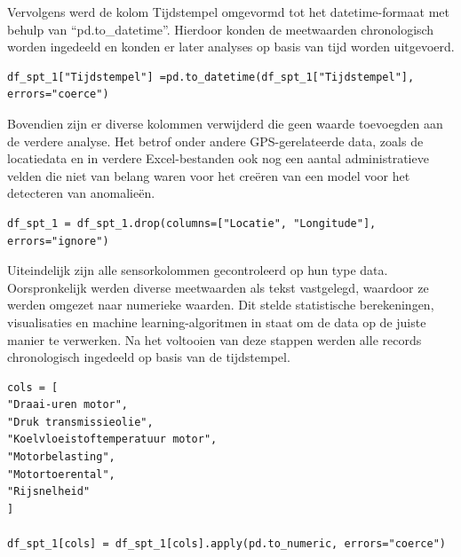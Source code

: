 Vervolgens werd de kolom Tijdstempel omgevormd tot het datetime-formaat met behulp van ``pd.to\_datetime''. Hierdoor konden de meetwaarden chronologisch worden ingedeeld en konden er later analyses op basis van tijd worden uitgevoerd.

\begin{listing}[H]
\begin{verbatim}
df_spt_1["Tijdstempel"] =pd.to_datetime(df_spt_1["Tijdstempel"], errors="coerce")
\end{verbatim}
\caption[Code snippet: datetime omzetting tractordata]{Regel code om de waarden om te zetten naar datetime-formaat.}
\end{listing}

\newpage

Bovendien zijn er diverse kolommen verwijderd die geen waarde toevoegden aan de verdere analyse. Het betrof onder andere GPS-gerelateerde data, zoals de locatiedata en in verdere Excel-bestanden ook nog een aantal administratieve velden die niet van belang waren voor het creëren van een model voor het detecteren van anomalieën.

\begin{listing}[H]
\begin{verbatim}
df_spt_1 = df_spt_1.drop(columns=["Locatie", "Longitude"], errors="ignore")
\end{verbatim}
\caption[Code snippet: droppen onnodige kolommen tractordata]{Regel code om onnodige kolommen te verwijderen.}
\end{listing}

Uiteindelijk zijn alle sensorkolommen gecontroleerd op hun type data. Oorspronkelijk werden diverse meetwaarden als tekst vastgelegd, waardoor ze werden omgezet naar numerieke waarden. Dit stelde statistische berekeningen, visualisaties en machine learning-algoritmen in staat om de data op de juiste manier te verwerken. Na het voltooien van deze stappen werden alle records chronologisch ingedeeld op basis van de tijdstempel.

\begin{listing}[H]
\begin{verbatim}
cols = [
"Draai-uren motor",
"Druk transmissieolie",
"Koelvloeistoftemperatuur motor",
"Motorbelasting",
"Motortoerental",
"Rijsnelheid"
]

df_spt_1[cols] = df_spt_1[cols].apply(pd.to_numeric, errors="coerce")
\end{verbatim}
\caption[Code snippet: numeriek maken tractordata]{Regels code om de kolommen numeriek te maken in de dataset.}
\end{listing}

